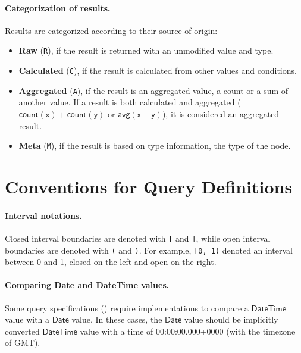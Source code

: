 \paragraph{Categorization of results.} Results are categorized according to their source of origin:

\begin{itemize}
	\item \textbf{Raw} (\texttt{R}), if the result is returned with an unmodified value and type.
	\item \textbf{Calculated} (\texttt{C}), if the result is calculated from other values and conditions.
	\item \textbf{Aggregated} (\texttt{A}), if the result is an aggregated value, \eg a count or a sum of another value. If a result is both calculated and aggregated (\eg $\mathsf{count(x) + count(y)}$ or $\mathsf{avg(x + y)}$), it is considered an aggregated result.
	\item \textbf{Meta} (\texttt{M}), if the result is based on type information, \eg the type of the node.
\end{itemize}



\section{Conventions for Query Definitions}

\paragraph{Interval notations.} Closed interval boundaries are denoted with 
\texttt{[} 
and \texttt{]}, while open interval boundaries are denoted with \texttt{(} and 
\texttt{)}. For example, \texttt{[0, 1)} denoted an interval between 0 and 1, 
closed on the left and open on the right.

\paragraph{Comparing Date and DateTime values.}

Some query specifications (\eg {}) require implementations to compare a
$\mathsf{DateTime}$ value with a $\mathsf{Date}$ value. In these cases, the 
$\mathsf{Date}$ value should be implicitly converted $\mathsf{DateTime}$ value 
with a time of 00:00:00.000+0000 (\ie with the timezone of GMT).

